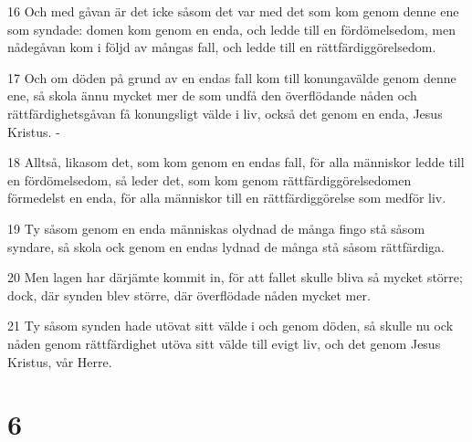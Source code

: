 \par 16 Och med gåvan är det icke såsom det var med det som kom genom denne ene som syndade: domen kom genom en enda, och ledde till en fördömelsedom, men nådegåvan kom i följd av mångas fall, och ledde till en rättfärdiggörelsedom.
\par 17 Och om döden på grund av en endas fall kom till konungavälde genom denne ene, så skola ännu mycket mer de som undfå den överflödande nåden och rättfärdighetsgåvan få konungsligt välde i liv, också det genom en enda, Jesus Kristus. -
\par 18 Alltså, likasom det, som kom genom en endas fall, för alla människor ledde till en fördömelsedom, så leder det, som kom genom rättfärdiggörelsedomen förmedelst en enda, för alla människor till en rättfärdiggörelse som medför liv.
\par 19 Ty såsom genom en enda människas olydnad de många fingo stå såsom syndare, så skola ock genom en endas lydnad de många stå såsom rättfärdiga.
\par 20 Men lagen har därjämte kommit in, för att fallet skulle bliva så mycket större; dock, där synden blev större, där överflödade nåden mycket mer.
\par 21 Ty såsom synden hade utövat sitt välde i och genom döden, så skulle nu ock nåden genom rättfärdighet utöva sitt välde till evigt liv, och det genom Jesus Kristus, vår Herre.

\chapter{6}


